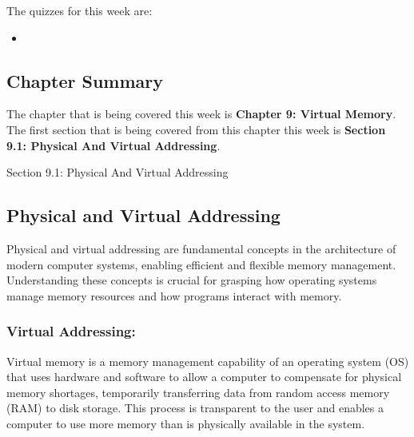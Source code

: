 The quizzes for this week are:

\begin{itemize}
    \item {}
\end{itemize}

\subsection{Chapter Summary}

The chapter that is being covered this week is \textbf{Chapter 9: Virtual Memory}. The first section that is being covered from this chapter this week is \textbf{Section 9.1: Physical And Virtual Addressing}.

\begin{notes}{Section 9.1: Physical And Virtual Addressing}
    \subsection*{Physical and Virtual Addressing}

    Physical and virtual addressing are fundamental concepts in the architecture of modern computer systems, enabling efficient and flexible memory management. Understanding these concepts is crucial 
    for grasping how operating systems manage memory resources and how programs interact with memory. \vspace*{1em}
    
    \subsubsection*{Virtual Addressing:}

    Virtual memory is a memory management capability of an operating system (OS) that uses hardware and software to allow a computer to compensate for physical memory shortages, temporarily transferring 
    data from random access memory (RAM) to disk storage. This process is transparent to the user and enables a computer to use more memory than is physically available in the system.
    

\end{notes}
